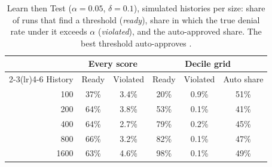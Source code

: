 \begin{table}[t]
\centering
\caption{Learn then Test ($\alpha=0.05$, $\delta=0.1$), \SimRuns{} simulated histories per size: share of runs that find a threshold (\emph{ready}), share in which the true denial rate under it exceeds $\alpha$ (\emph{violated}), and the auto-approved share. The best threshold auto-approves \SimOptimal{}.}
\label{tab:simulation}
\setlength{\tabcolsep}{3pt}
\small
\begin{tabular}{rccccc}
\toprule
& \multicolumn{2}{c}{Every score} & \multicolumn{3}{c}{Decile grid} \\
\cmidrule(lr){2-3}\cmidrule(lr){4-6}
History & Ready & Violated & Ready & Violated & Auto share \\
\midrule
100 & 37\% & 3.4\% & 20\% & 0.9\% & 51\% \\
200 & 64\% & 3.8\% & 53\% & 0.1\% & 41\% \\
400 & 64\% & 2.7\% & 79\% & 0.2\% & 45\% \\
800 & 66\% & 3.2\% & 82\% & 0.1\% & 47\% \\
1600 & 63\% & 4.6\% & 98\% & 0.1\% & 49\% \\
\bottomrule
\end{tabular}
\end{table}
